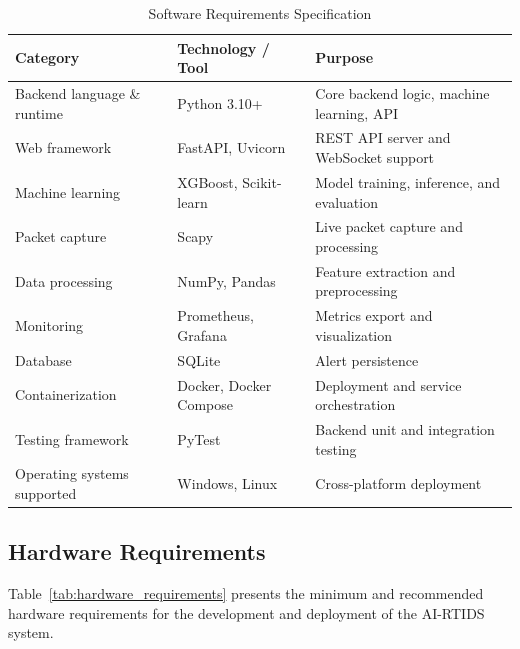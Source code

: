 \documentclass[12pt,a4paper]{report}
\begin{document}
\begin{table}[htbp]
\centering
\caption{Software Requirements Specification}
\label{tab:software_requirements}
\renewcommand{\arraystretch}{1.25}
\setlength{\tabcolsep}{4pt}

\begin{tabularx}{\textwidth}{|p{3.0cm}|p{3.2cm}|X|}
\hline
\textbf{Category} & \textbf{Technology / Tool} & \textbf{Purpose} \\
\hline
Backend language \& runtime & Python 3.10+ & Core backend logic, machine learning, API \\
\hline
Web framework & FastAPI, Uvicorn & REST API server and WebSocket support \\
\hline
Machine learning & XGBoost, Scikit-learn & Model training, inference, and evaluation \\
\hline
Packet capture & Scapy & Live packet capture and processing \\
\hline
Data processing & NumPy, Pandas & Feature extraction and preprocessing \\
\hline
Monitoring & Prometheus, Grafana & Metrics export and visualization \\
\hline
Database & SQLite & Alert persistence \\
\hline
Containerization & Docker, Docker Compose & Deployment and service orchestration \\
\hline
Testing framework & PyTest & Backend unit and integration testing \\
\hline
Operating systems supported & Windows, Linux & Cross-platform deployment \\
\hline
\end{tabularx}
\end{table}

\subsection{Hardware Requirements}

Table~\ref{tab:hardware_requirements} presents the minimum and recommended hardware requirements for the development and deployment of the AI-RTIDS system.
\end{document}
